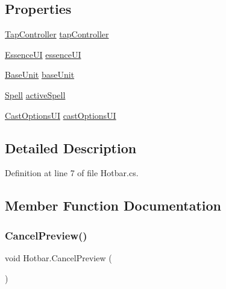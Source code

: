 \subsection*{Properties}
\begin{DoxyCompactItemize}
\item 
\mbox{\hyperlink{class_tap_controller}{Tap\+Controller}} \mbox{\hyperlink{class_hotbar_a0281562a5bf5e3224f4d88f090bf3a84}{tap\+Controller}}
\item 
\mbox{\hyperlink{class_essence_u_i}{Essence\+UI}} \mbox{\hyperlink{class_hotbar_a02baa28776d8464929571a32904d78a5}{essence\+UI}}
\item 
\mbox{\hyperlink{class_base_unit}{Base\+Unit}} \mbox{\hyperlink{class_hotbar_a4a0bb9b20e1c7c8df122470fd540768b}{base\+Unit}}
\item 
\mbox{\hyperlink{class_spell}{Spell}} \mbox{\hyperlink{class_hotbar_ab8c1abafc83f793590f0bf08981d50ef}{active\+Spell}}
\item 
\mbox{\hyperlink{class_cast_options_u_i}{Cast\+Options\+UI}} \mbox{\hyperlink{class_hotbar_a5712a8564c6cdbae01f3900648ce9fae}{cast\+Options\+UI}}
\end{DoxyCompactItemize}


\subsection{Detailed Description}


Definition at line 7 of file Hotbar.\+cs.



\subsection{Member Function Documentation}
\mbox{\label{class_hotbar_a0c213365074f45fd1b1010eabe3f3d4d}} 
\subsubsection{\texorpdfstring{CancelPreview()}{CancelPreview()}}
{\footnotesize\ttfamily void Hotbar.\+Cancel\+Preview (\begin{DoxyParamCaption}{ }\end{DoxyParamCaption})}



